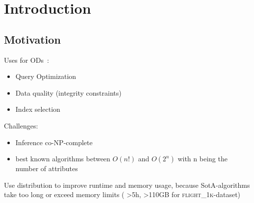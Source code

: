 
\section{Introduction}\label{sec:intro}

  \subsection{Motivation}
	
  Uses for ODs~\cite{szlichta:fundamentals}:
  \begin{itemize}
    \item Query Optimization
    \item Data quality (integrity constraints)
    \item Index selection
  \end{itemize}

  Challenges:
  \begin{itemize}
    \item Inference co-NP-complete \citep{ginsburg}
    \item best known algorithms between $O(n!)$ \citep{consonni} and $O(2^n)$ \citep{szlichta:discovery} with n being the number of attributes 
  \end{itemize}

  Use distribution to improve runtime and memory usage, because SotA-algorithms take too long or exceed memory limits ( >5h, >110GB for \textsc{flight\_1k}-dataset)
  
